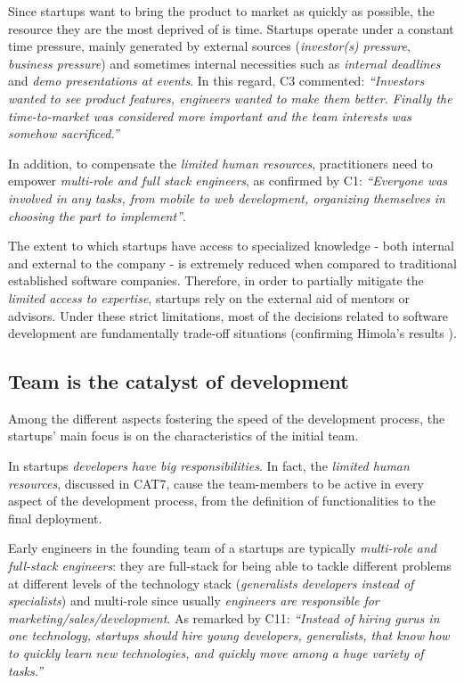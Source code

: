 \documentclass[10pt,journal,letterpaper,compsoc]{IEEEtran}
\begin{document}
Since startups want to bring the product to market as quickly as possible, the resource they are the most deprived of is time. Startups operate under a constant time pressure, mainly generated by external sources (\textit{investor(s) pressure}, \textit{business pressure}) and sometimes internal necessities such as \textit{internal deadlines} and \textit{demo presentations at events}. In this regard, C3 commented: \textit{``Investors wanted to see product features, engineers wanted to make them better. Finally the time-to-market was considered more important and the team interests was somehow sacrificed.''}

In addition, to compensate the \textit{limited human resources},  practitioners need to empower \textit{multi-role and full stack engineers}, as confirmed by C1: \textit{``Everyone was involved in any tasks, from mobile to web development, organizing themselves in choosing the part to implement''}.

The extent to which startups have access to specialized knowledge - both internal and external to the company - is extremely reduced when compared to traditional established software companies. Therefore, in order to partially mitigate the \textit{limited access to expertise}, startups rely on the external aid of mentors or advisors. Under these strict limitations, most of the decisions related to software development are fundamentally trade-off situations (confirming Himola's results \cite{Hilmola2003}).
\subsection{Team is the catalyst of development}
\label{res:gsm:cat4}
Among the different aspects fostering the speed of the development process, the startups' main focus is on the characteristics of the initial team.

In startups \textit{developers have big responsibilities}. In fact, the \textit{limited human resources}, discussed in CAT7, cause the team-members to be active in every aspect of the development process, from the definition of functionalities to the final deployment.

Early engineers in the founding team of a startups are typically \textit{multi-role and full-stack engineers}: they are full-stack for being able to tackle different problems at different levels of the technology stack (\textit{generalists developers instead of specialists}) and multi-role since usually \textit{engineers are responsible for marketing/sales/development}. As remarked by  C11: \textit{``Instead of hiring gurus in one technology, startups should hire young developers, generalists, that know how to quickly learn new technologies, and quickly move among a huge variety of tasks.''}
\end{document}
